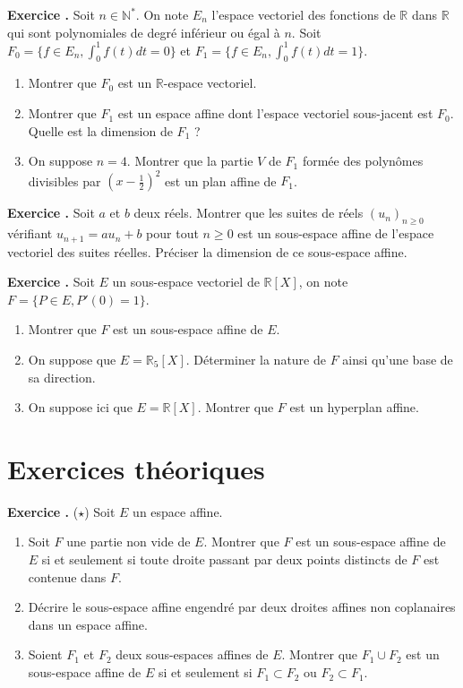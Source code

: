 \documentclass[10pt,a4paper]{article}
\def\bf#1{\textbf{#1}}
\newcounter{nexo}
\newcommand{\exo}{\medskip\noindent \bf{ Exercice \thenexo. \stepcounter{nexo}}}
\def\be{\begin{enumerate}}
\def\ee{\end{enumerate}}
\def\sev{sous-espace vectoriel }
\def\R{\mathbb{R}}
\begin{document}
\medskip
\exo
Soit $n\in\mathbb N^*$. On note $E_n$ l'espace vectoriel des fonctions de $\mathbb R$ dans $\mathbb R$ qui sont polynomiales de degr\'e inf\'erieur ou \'egal \`a $n$. Soit 
$F_0=\{f\in E_n,\int_0^1 f(t) d t=0 \}$ et $F_1=\{f\in E_n,\int_0^1 f(t) d t=1 \}$.
\begin{enumerate}
  \item Montrer que $F_0$ est un $\mathbb R$-espace vectoriel.
  \item Montrer que $F_1$ est un espace affine dont l'espace vectoriel sous-jacent est $F_0$. Quelle est la dimension de $F_1$ ?
  \item On suppose $n=4$. Montrer que la partie $V$ de $F_1$ form\'ee des polynômes divisibles par $\left(x-\frac{1}{2}\right)^2$ est un plan affine de $F_1$.
\end{enumerate}

\medskip

\exo
Soit $a$ et $b$ deux r\'eels. Montrer que les suites de r\'eels $(u_n)_{n\geq
0}$ v\'erifiant $u_{n+1}=au_n+b$ pour tout $n\geq 0$ est un sous-espace
affine de l'espace vectoriel des suites r\'eelles. Pr\'eciser la dimension de
ce sous-espace affine. 


\medskip

\exo
Soit $E$ un \sev de $\R[X]$, on note $F=\{P\in E, P'(0)=1\}$. 
\be
\item Montrer que $F$ est un sous-espace affine de $E$. 
\item On suppose que $E=\R_5[X]$. D\'eterminer la nature de $F$ ainsi qu'une base de sa direction.
\item On suppose ici que $E=\R[X]$. Montrer que $F$ est un hyperplan affine. 
\ee

\section{Exercices th\'eoriques}

\exo ($\star$)
Soit $E$ un espace affine.
\begin{enumerate}
  \item Soit $F$ une partie non vide de $E$. Montrer que $F$ est un sous-espace affine de $E$ si et seulement si toute droite passant par deux points distincts de $F$ est contenue dans $F$.
  \item D\'ecrire le sous-espace affine engendr\'e par deux droites affines non coplanaires dans un espace affine.
  \item Soient $F_1$ et $F_2$ deux sous-espaces affines de $E$. Montrer que $F_1\cup F_2$ est un sous-espace affine de $E$ si et seulement si $F_1\subset F_2$ ou $F_2\subset F_1$.
\end{enumerate}
\end{document}

